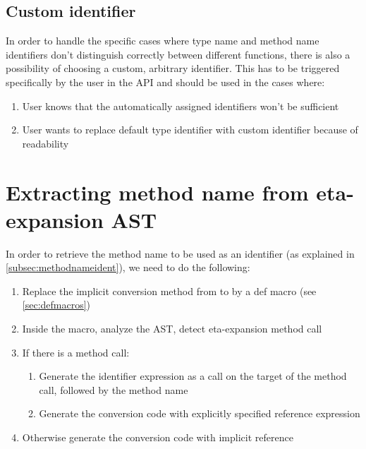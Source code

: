 \subsection{Custom identifier}

In order to handle the specific cases where type name and method name identifiers don't distinguish correctly between different functions, there is also a possibility of choosing a custom, arbitrary identifier. This has to be triggered specifically by the user in the API and should be used in the cases where:

\begin{enumerate}
	\item User knows that the automatically assigned identifiers won't be sufficient
	\item User wants to replace default type identifier with custom identifier because of readability
\end{enumerate}


\section{Extracting method name from eta-expansion AST}

In order to retrieve the method name to be used as an identifier (as explained in \ref{subsec:methodnameident}), we need to do the following:

\begin{enumerate}
	\item Replace the implicit conversion method from  to  by a def macro (see \ref{sec:defmacros})
	\item Inside the macro, analyze the AST, detect eta-expansion method call
	\item If there is a method call:
	\begin{enumerate}
		\item Generate the identifier expression as a  call on the target of the method call, followed by the method name
		\item Generate the conversion code with explicitly specified reference expression
	\end{enumerate}
	\item Otherwise generate the conversion code with implicit reference	
\end{enumerate}

